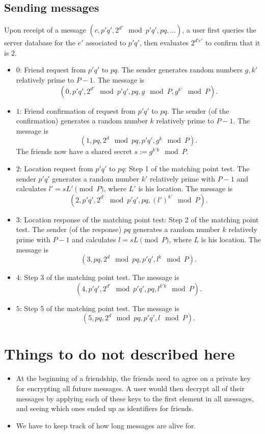 \documentclass{article}
\begin{document}
\subsection{Sending messages}
Upon receipt of a message $(c, p'q',2^{d'} \mod p'q',pq,...)$, a user first queries the server database for the $e'$ associated to $p'q'$, then evaluates $2^{d'e'}$ to confirm that it is $2$.
\begin{itemize}
    \item $0$: Friend request from $p'q'$ to $pq$. The sender generates random numbers $g,k'$ relatively prime to $P-1$. The message is
    $$(0, p'q',2^{d'} \mod{p'q'}, pq,g \mod{P},g^{k'} \mod{P}).$$
    \item $1$: Friend confirmation of request from $p'q'$ to $pq$. The sender (of the confirmation) generates a random number $k$ relatively prime to $P-1$. The message is
    $$(1, pq,2^d \mod{pq},p'q',g^k \mod{P}).$$
    The friends now have a shared secret $s:=g^{k'k} \mod{P}$.
    \item $2$: Location request from $p'q'$ to $pq$: Step 1 of the matching point test. The sender $p'q'$ generates a random number $k'$ relatively prime with $P-1$ and calculates $l'=s L' \pmod{P}$, where $L'$ is his location. The message is
    $$(2, p'q',2^{d'} \mod{p'q'}, pq, (l')^{k'} \mod{P}).$$
    \item $3$: Location response of the matching point test: Step 2 of the matching point test. The sender (of the response) $pq$ generates a random number $k$ relatively prime with $P-1$ and calculates $l=sL \pmod{P}$, where $L$ is his location. The message is
    $$(3, pq,2^d \mod{pq},p'q',l^k \mod{P}).$$
    \item $4$: Step 3 of the matching point test. The message is
    $$(4, p'q',2^{d'} \mod{p'q'}, pq, l^{k'k} \mod{P}).$$
    \item $5$: Step 5 of the matching point test. The message is
    $$(5, pq,2^d \mod{pq},p'q',l \mod{P}).$$
\end{itemize}

\section{Things to do not described here}
\begin{itemize}
\item At the beginning of a friendship, the friends need to agree on a private key for encrypting all future messages. A user would then decrypt all of their messages by applying each of these keys to the first element in all messages, and seeing which ones ended up as identifiers for friends.
\item We have to keep track of how long messages are alive for.
\end{itemize}
\end{document}

